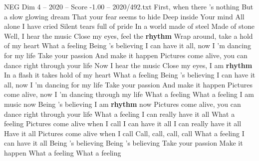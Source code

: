 \begin{textsample}{NEG Dim 4 – 2020 – Score -1.00 – 2020/492.txt}  \label{ex:f4_neg_027}
First, when there 's nothing But a slow glowing dream That your fear seems to hide Deep inside Your mind All alone I have cried Silent tears full of pride In a world made of steel Made of stone Well, I hear the music Close my eyes, feel the \textbf{rhythm} Wrap around, take a hold of my heart What a feeling Being 's believing I can have it all, now I 'm dancing for my life Take your passion And make it happen Pictures come alive, you can dance right through your life Now I hear the music Close my eyes, I am \textbf{rhythm} In a flash it takes hold of my heart What a feeling Being 's believing I can have it all, now I 'm dancing for my life Take your passion And make it happen Pictures come alive, now I 'm dancing through my life What a feeling What a feeling I am music now Being 's believing I am \textbf{rhythm} now Pictures come alive, you can dance right through your life What a feeling I can really have it all What a feeling Pictures come alive when I call I can have it all I can really have it all Have it all Pictures come alive when I call Call, call, call, call What a feeling I can have it all Being 's believing Being 's believing Take your passion Make it happen What a feeling What a feeling

\end{textsample}
